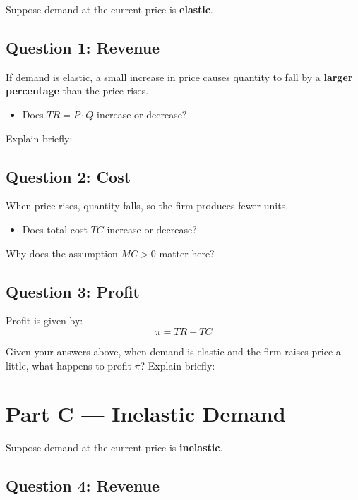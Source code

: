 \documentclass[11pt]{article}
\begin{document}
Suppose demand at the current price is \textbf{elastic}.

\subsection*{Question 1: Revenue}

If demand is elastic, a small increase in price causes quantity to fall by a \textbf{larger percentage} than the price rises.

\begin{itemize}
    \item Does $TR = P \cdot Q$ increase or decrease?

\end{itemize}

Explain briefly:
\vspace{2em}

\subsection*{Question 2: Cost}

When price rises, quantity falls, so the firm produces fewer units.

\begin{itemize}
    \item Does total cost $TC$ increase or decrease?
\end{itemize}

Why does the assumption $MC > 0$ matter here?

\vspace{3em}

\subsection*{Question 3: Profit}

Profit is given by:
\[
    \pi = TR - TC
\]

Given your answers above, when demand is elastic and the firm raises price a little, what happens to profit $\pi$?
Explain briefly:
\vspace{3em}

\newpage

\section*{Part C — Inelastic Demand}

Suppose demand at the current price is \textbf{inelastic}.

\subsection*{Question 4: Revenue}
\end{document}
